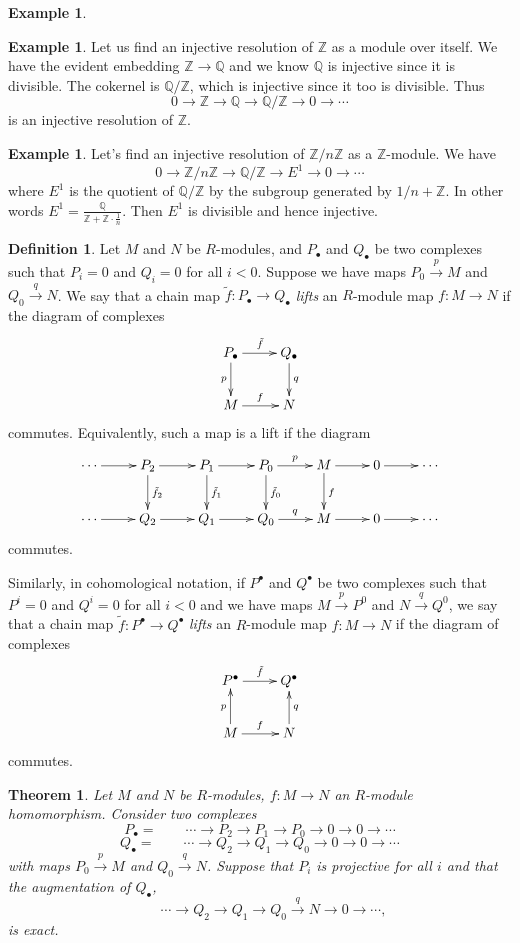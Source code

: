 \documentclass{amsart}[12pt]
\newcommand{\Q}{\mathbb{Q}}
\newcommand{\Z}{\mathbb{Z}}
\newcommand{\DEF}[1]{\emph{#1}\index{#1}}
\numberwithin{equation}{section}
\theoremstyle{plain} %
\newtheorem{thm}[equation]{Theorem}
\theoremstyle{definition}
\newtheorem{defn}[equation]{Definition}
\newtheorem{ex}[equation]{Example}
\theoremstyle{remark}
\newcommand{\xra}[1]{\xrightarrow{#1}}
\begin{document}
\begin{ex}
\begin{ex} Let us  find an injective resolution of $\Z$ as a module over itself. We have the evident embedding $\Z \to \Q$ and we know $\Q$ is injective since
  it is divisible. The cokernel is $\Q/\Z$, which is injective since it too is divisible. Thus
$$
0 \to \Z \to \Q \to \Q/\Z \to 0 \to \cdots
$$
is an injective resolution of $\Z$.
\end{ex}


\begin{ex} 
Let's find an injective resolution of $\Z/n\Z$ as a $\Z$-module. We have
$$
0 \to \Z/n\Z \to \Q/\Z \to E^1 \to 0 \to \cdots
$$
where $E^1$ is the quotient of $\Q/\Z$ by the subgroup generated by $1/n + \Z$. In other words
$E^1 = \frac{\Q}{\Z + \Z \cdot \frac{1}{n}}$. Then $E^1$ is divisible and hence injective. 
\end{ex}

\begin{defn} Let $M$ and $N$ be $R$-modules, and $P_\bullet$ and $Q_\bullet$ be two complexes such that $P_i=0$ and $Q_i=0$ for all $i<0$. Suppose we have maps $P_0 \xra{p} M$ and $Q_0 \xra{q} N$. We say that a chain map $\tilde{f}:P_\bullet \to Q_\bullet$ \DEF{lifts} an $R$-module map $f:M\to N$ if the diagram of complexes
\[ \xymatrix{ P_\bullet \ar[r]^{\tilde{f}} \ar[d]_p & Q_\bullet \ar[d]^q  \\ M \ar[r]^f & N}\] commutes. Equivalently, such a map is a lift if the diagram
\[ \xymatrix{ \cdots \ar[r] & P_2 \ar[d]^{\tilde{f}_2} \ar[r] & P_1 \ar[d]^{\tilde{f}_1}\ar[r] & P_0 \ar[d]^{\tilde{f}_0} \ar[r]^p & M \ar[r] \ar[d]^{f} & 0 \ar[r] & \cdots \\
\cdots \ar[r] & Q_2 \ar[r] & Q_1 \ar[r] & Q_0 \ar[r]^q & M \ar[r] & 0 \ar[r] & \cdots}\]
commutes.

Similarly, in cohomological notation, if $P^\bullet$ and $Q^\bullet$ be two complexes such that $P^i=0$ and $Q^i=0$ for all $i<0$ and  we have maps $M \xra{p} P^0$ and $N \xra{q} Q^0$, we say that a chain map $\tilde{f}:P^\bullet \to Q^\bullet$ \DEF{lifts} an $R$-module map $f:M\to N$ if the diagram of complexes
\[ \xymatrix{ P^\bullet \ar[r]^{\tilde{f}}  & Q^\bullet   \\ M \ar[r]^f \ar[u]^p & N \ar[u]_q}\] commutes.
\end{defn}


\begin{thm} \label{thm121b} Let $M$ and $N$ be $R$-modules, $f: M \to N$ an $R$-module homomorphism. 
Consider two complexes
\[
P_\bullet=  \qquad  \cdots \to P_2 \to P_1\to P_0 \to 0 \to 0 \to \cdots
\]
\[
Q_\bullet = \qquad \cdots \to Q_2 \to Q_1\to Q_0 \to 0 \to 0 \to \cdots
\]
with maps $P_0 \xra{p} M$ and $Q_0 \xra{q} N$.
Suppose that $P_i$ is projective for all $i$ and that the augmentation of $Q_\bullet$,
\[
\qquad \cdots \to Q_2 \to Q_1\to Q_0 \xra{q} N \to 0 \to \cdots,
\]
is exact.
  

\end{thm}
\end{ex}
\end{document}
